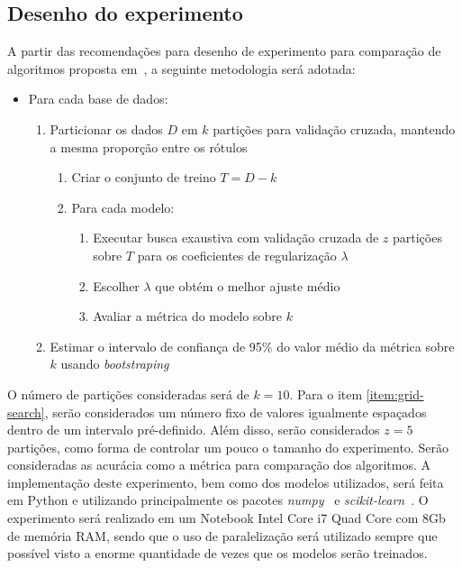 \documentclass[conference]{IEEEtran}
\begin{document}
	\subsection{Desenho do experimento}
	A partir das recomendações para desenho de experimento para comparação de algoritmos proposta em~\cite{salzberg1997comparing}, a seguinte metodologia será adotada:
	\begin{itemize}
		\item Para cada base de dados:
			\begin{enumerate}
			\item Particionar os dados $D$ em $k$ partições para validação cruzada, mantendo a mesma proporção entre os rótulos
			\begin{enumerate}
				\item Criar o conjunto de treino $T = D - k$
				\item Para cada modelo:
				\begin{enumerate}
					\item Executar busca exaustiva com validação cruzada de $z$ partições sobre $T$ para os coeficientes de regularização $\lambda$ \label{item:grid-search}
					\item Escolher $\lambda$ que obtém o melhor ajuste médio 
					\item Avaliar a métrica do modelo sobre $k$
				\end{enumerate}
			\end{enumerate}
			\item Estimar o intervalo de confiança de 95\% do valor médio da métrica sobre $k$ usando \textit{bootstraping}
		\end{enumerate}
	\end{itemize}
	
	O número de partições consideradas será de $k=10$. Para o item \ref{item:grid-search}, serão considerados um número fixo de valores igualmente espaçados dentro de um intervalo pré-definido. Além disso, serão considerados $z=5$ partições, como forma de controlar um pouco o tamanho do experimento. Serão consideradas as acurácia como a métrica para comparação dos algoritmos. A implementação deste experimento, bem como dos modelos utilizados, será feita em Python e utilizando principalmente os pacotes \textit{numpy}~\cite{harris2020array} e \textit{scikit-learn}~\cite{scikit-learn}. O experimento será realizado em um Notebook Intel Core i7 Quad Core com 8Gb de memória RAM, sendo que o uso de paralelização será utilizado sempre que possível visto a enorme quantidade de vezes que os modelos serão treinados.
	
\end{document}
